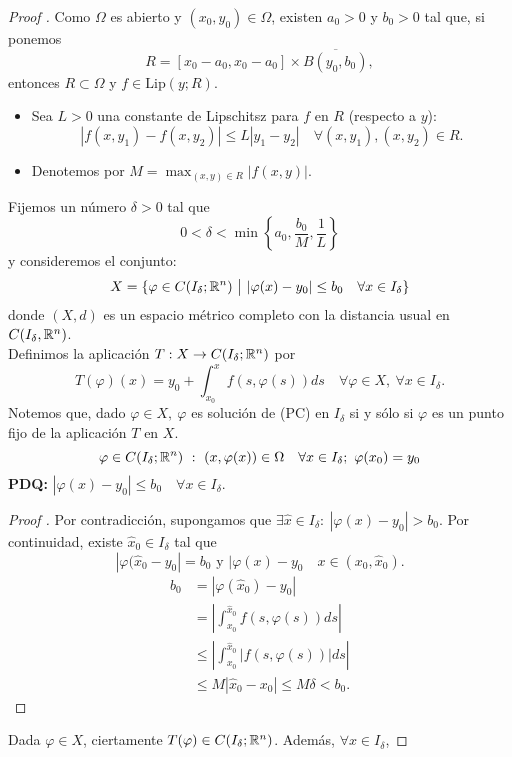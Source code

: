 \documentclass[a4paper]{report}
\begin{document}
\begin{proof}[Proof ]
	Como $\Omega$ es abierto y $(x_0,y_0) \in \Omega$, existen $a_0>0$ y $b_{0}>0$ tal que, si ponemos
	\[ R = [x_0-a_0,x_{0}-a_{0}] \times \overline{B(y_0,b_0)}, \]
	entonces $R \subset \Omega$ y $f \in \text{Lip}(y;R)$.
	\begin{itemize}
		\item Sea $L>0$ una constante de Lipschitsz para $f$ en $R$ (respecto a $y$):
		\[ |f(x,y_{1}) - f(x,y_{2})| \leq L |y_{1} - y_{2}|\quad \forall (x,y_{1}),(x,y_{2})\in R. \]

		\item Denotemos por $M = \max_{(x,y)\in R} |f(x,y)|$.
	\end{itemize}
	Fijemos un número $\delta>0$ tal que 
	\[ 0 < \delta < \min \left\{a_0, \frac{b_0}{M}, \frac{1}{L} \right\} \]
	y consideremos el conjunto:
	\[ X = \{ \varphi \in C(I_{\delta};\mathbb{R}^n) \ \big{|} \ |\varphi(x) - y_{0}| \leq b_{0} \quad \forall x \in I_{\delta} \} \]  
	donde $(X,d)$ es un espacio métrico completo con la distancia usual en $C(I_{\delta},\mathbb{R}^n)$. \\
	Definimos la aplicación $T: X \to C(I_{\delta};\mathbb{R}^n)$ por
	\[ T(\varphi)(x) = y_{0} + \int_{x_{0}}^{x} f(s,\varphi(s))ds \quad \forall \varphi \in X,\ \forall x \in I_{\delta}. \]
	Notemos que, dado $\varphi \in X, \ \varphi$ es solución de (PC) en $I_{\delta}$ si y sólo si $\varphi$ es un punto fijo de la aplicación $T$ en $X$.
	\[ \varphi \in C(I_{\delta};\R^n)\ : \ (x,\varphi(x)) \in \Omega \quad \forall x \in I_{\delta};\ \varphi(x_{0})=y_{0} \]
	\textbf{PDQ:} $|\varphi(x)-y_{0}| \leq b_{0}\quad \forall x \in I_{\delta}$.
	\begin{proof}[Proof ]
		Por contradicción, supongamos que $\exists \hat{x} \in I_{\delta}:\ |\varphi(x)-y_{0}| > b_{0}$. Por continuidad, existe $\hat{x}_0 \in I_{\delta}$ tal que 
		\[ |\varphi(\hat{x}_{0} - y_{0}| = b_{0} \text{ y } |\varphi(x) -y_{0}\quad x \in (x_{0},\hat{x}_0). \]
		\begin{align*}
			b_{0} & = |\varphi(\hat{x}_0)-y_{0}| \\ 
			& = \left| \int_{x_0}^{\hat{x}_0} f(s,\varphi(s))ds \right| \\
			& \leq \left| \int_{x_0}^{\hat{x}_0 } |f(s,\varphi(s))| ds \right| \\
			& \leq M |\hat{x}_0 - x_{0}| \leq M \delta < b_0 
		.\end{align*}
	\end{proof}
	\noindent Dada $\varphi \in X$, ciertamente $T(\varphi) \in C(I_{\delta};\mathbb{R}^n)$. Además, $\forall x \in I_{\delta}$,

\end{proof}
\end{document}
